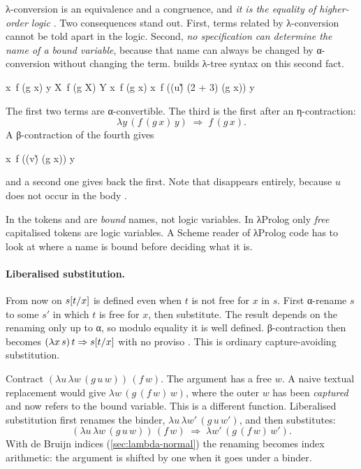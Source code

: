 λ-conversion is an equivalence and a congruence, and \emph{it is the equality of higher-order logic}
. Two consequences stand out. First, terms related by λ-conversion cannot be told apart in
the logic. Second, \emph{no specification can determine the name of a bound variable}, because that
name can always be changed by α-conversion without changing the term.  builds
λ-tree syntax on this second fact.

\begin{example}\label{ex:lambda-four}\leavevmode
\begin{lprolog}
x\y\ f (g x) y
X\Y\ f (g X) Y
x\ f (g x)
x\y\ f ((u\v\v) (2 + 3) (g x)) y
\end{lprolog}
The first two terms are α-convertible. The third is the first after an η-contraction:
\[\lambda y\,(f\,(g\,x)\,y)\;\Rightarrow\;f\,(g\,x).\]
A β-contraction of the fourth gives
\begin{lprolog}
x\y\ f ((v\v) (g x)) y
\end{lprolog}
and a second one gives back the first. Note that  disappears entirely, because $u$ does
not occur in the body .
\end{example}

\begin{pitfall}
In  the tokens  and  are \emph{bound} names, not logic variables. In
λProlog only \emph{free} capitalised tokens are logic variables. A Scheme reader of λProlog code has to
look at where a name is bound before deciding what it is.
\end{pitfall}

\paragraph{Liberalised substitution.} From now on $s[t/x]$ is defined even when $t$ is not free
for $x$ in $s$. First α-rename $s$ to some $s'$ in which $t$ is free for $x$, then substitute. The result
depends on the renaming only up to α, so modulo equality it is well defined. β-contraction then becomes
$(\lambda x\,s)\,t\Rightarrow s[t/x]$ with no proviso . This is ordinary
capture-avoiding substitution.

\begin{tutorial}
Contract $(\lambda u\,\lambda w\,(g\,u\,w))\,(f\,w)$. The argument has a free $w$. A naive textual
replacement would give $\lambda w\,(g\,(f\,w)\,w)$, where the outer $w$ has been \emph{captured} and now
refers to the bound variable. This is a different function. Liberalised substitution first renames the
binder, $\lambda u\,\lambda w'\,(g\,u\,w')$, and then substitutes:
\[
  (\lambda u\,\lambda w\,(g\,u\,w))\,(f\,w)\;\Rightarrow\;\lambda w'\,(g\,(f\,w)\,w').
\]
With de Bruijn indices (\cref{sec:lambda-normal}) the renaming becomes index arithmetic: the argument
is shifted by one when it goes under a binder.
\end{tutorial}

